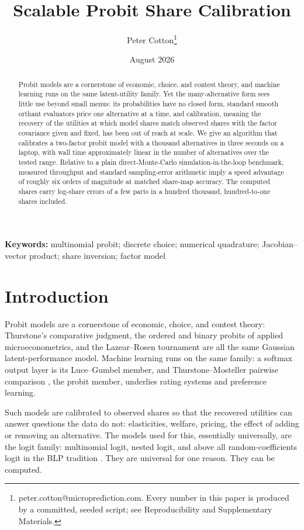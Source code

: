 \documentclass[12pt]{article}
\title{Scalable Probit Share Calibration}
\author{Peter Cotton\thanks{peter.cotton@microprediction.com. Every
number in this paper is produced by a committed, seeded script; see
Reproducibility and Supplementary Materials.}}
\date{August 2026}
\theoremstyle{remark}
\begin{document}
\maketitle

\begin{abstract}
Probit models are a cornerstone of economic, choice, and contest theory, and
machine learning runs on the same latent-utility family. Yet the
many-alternative form sees little use beyond small menus: its probabilities
have no closed form, standard smooth orthant evaluators price one
alternative at a time, and calibration, meaning the recovery of the utilities at which model
shares match observed shares with the factor covariance given and fixed,
has been out of reach at scale. We give an
algorithm that calibrates a two-factor probit model with a thousand
alternatives in three seconds on a laptop, with wall time approximately
linear in the number of alternatives over the tested range. Relative to
a plain direct-Monte-Carlo simulation-in-the-loop benchmark, measured
throughput and standard sampling-error arithmetic imply a speed
advantage of roughly six orders of magnitude at matched share-map
accuracy. The computed shares carry log-share errors of a few parts in
a hundred thousand, hundred-to-one shares included.
\end{abstract}

\noindent\textbf{Keywords:} multinomial probit; discrete choice;
numerical quadrature; Jacobian--vector product; share inversion; factor
model

\section{Introduction}

Probit models are a cornerstone of economic, choice, and contest theory:
Thurstone's comparative judgment, the ordered and binary probits of applied
microeconometrics, and the Lazear--Rosen tournament
\citep{lazear1981} are all the same
Gaussian latent-performance model. Machine learning runs on the same
family: a softmax output layer is its Luce--Gumbel member, and
Thurstone--Mosteller pairwise comparison \citep{mosteller1951}, the
probit member, underlies
rating systems and preference learning.

Such models are calibrated to observed shares so that the recovered
utilities can answer questions the data do not: elasticities, welfare,
pricing, the effect of adding or removing an alternative. The models used
for this, essentially universally, are the logit family: multinomial logit,
nested logit, and above all random-coefficients logit in the BLP tradition
\citep{berry1995,train2009,conlon2020}. They are universal for one reason.
They can be computed.
\end{document}
